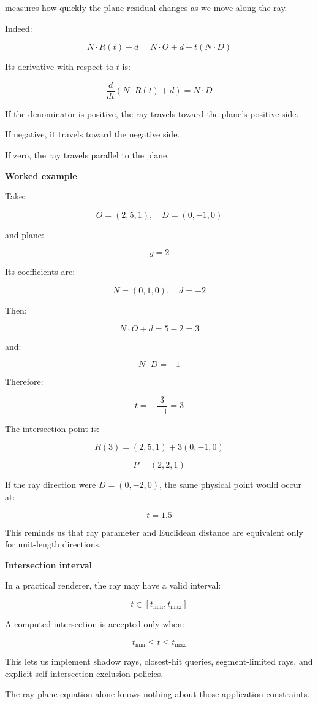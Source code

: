 measures how quickly the plane residual changes as we move along the ray.

Indeed:

\[
N\cdot R(t)+d= N\cdot O+d+t(N\cdot D)
\]

Its derivative with respect to \(t\) is:

\[
\frac{d}{dt}(N\cdot R(t)+d)=N\cdot D
\]

If the denominator is positive, the ray travels toward the plane's positive side.

If negative, it travels toward the negative side.

If zero, the ray travels parallel to the plane.

\textbf{Worked example}

Take:

\[
O=(2,5,1),\quad D=(0,-1,0)
\]

and plane:

\[
y=2
\]

Its coefficients are:

\[
N=(0,1,0),\quad d=-2
\]

Then:

\[
N\cdot O+d=5-2=3
\]

and:

\[
N\cdot D=-1
\]

Therefore:

\[
t=-\frac3{-1}=3
\]

The intersection point is:

\[
R(3)=(2,5,1)+3(0,-1,0)
\]

\[
\boxed{P=(2,2,1)}
\]

If the ray direction were \(D=(0,-2,0)\), the same physical point would occur at:

\[
t=1.5
\]

This reminds us that ray parameter and Euclidean distance are equivalent only for unit-length directions.

\textbf{Intersection interval}

In a practical renderer, the ray may have a valid interval:

\[
t\in[t_{\min},t_{\max}]
\]

A computed intersection is accepted only when:

\[
\boxed{ t_{\min}\le t\le t_{\max} }
\]

This lets us implement shadow rays, closest-hit queries, segment-limited rays, and explicit self-intersection exclusion policies.

The ray-plane equation alone knows nothing about those application constraints.

